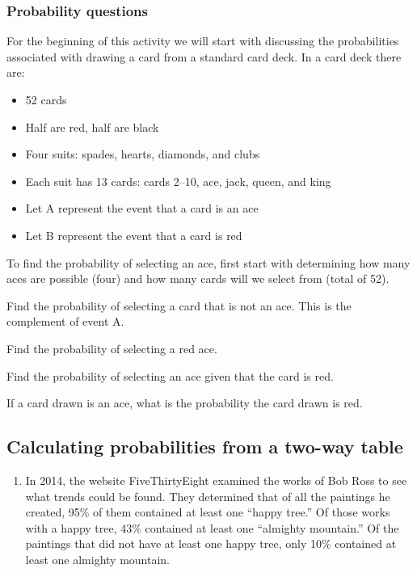 \documentclass[
]{report}
\providecommand{\tightlist}{%
  \setlength{\itemsep}{0pt}\setlength{\parskip}{0pt}}
\begin{document}
\subsubsection{Probability questions}\label{probability-questions}

For the beginning of this activity we will start with discussing the probabilities associated with drawing a card from a standard card deck. In a card deck there are:

\begin{itemize}
\item
  52 cards
\item
  Half are red, half are black
\item
  Four suits: spades, hearts, diamonds, and clubs
\item
  Each suit has 13 cards: cards 2--10, ace, jack, queen, and king
\item
  Let A represent the event that a card is an ace
\item
  Let B represent the event that a card is red
\end{itemize}

To find the probability of selecting an ace, first start with determining how many aces are possible (four) and how many cards will we select from (total of 52).

\vspace{1in}

Find the probability of selecting a card that is not an ace. This is the complement of event A.

\vspace{1in}

Find the probability of selecting a red ace.

\vspace{1in}

Find the probability of selecting an ace given that the card is red.

\vspace{1in}

If a card drawn is an ace, what is the probability the card drawn is red.

\vspace{1in}

\subsection{Calculating probabilities from a two-way table}\label{calculating-probabilities-from-a-two-way-table}

\begin{enumerate}
\def\labelenumi{\arabic{enumi}.}
\tightlist
\item
  In 2014, the website FiveThirtyEight examined the works of Bob Ross to see what trends could be found. They determined that of all the paintings he created, 95\% of them contained at least one ``happy tree.'' Of those works with a happy tree, 43\% contained at least one ``almighty mountain.'' Of the paintings that did not have at least one happy tree, only 10\% contained at least one almighty mountain.
  \vspace{1mm}
\end{enumerate}
\end{document}
